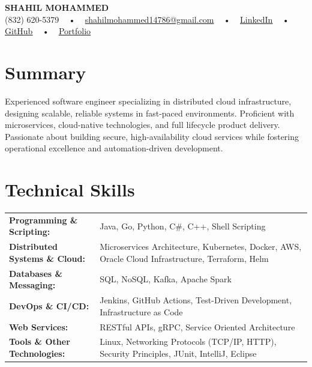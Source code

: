 \documentclass[letterpaper,11pt]{article}
\begin{document}
\begin{center}
    {\fontsize{14pt}{12pt}\selectfont \textbf{\MakeUppercase{Shahil Mohammed}}}\\ \vspace{2pt}
    \fontsize{10pt}{12pt}\selectfont (832) 620-5379 ~ • ~ \href{mailto:shahilmohammed14786@gmail.com}{shahilmohammed14786@gmail.com} ~ • ~  
    \href{https://www.linkedin.com/in/shahil-mohammed-9652931a1/}{\color{blue}\underline{LinkedIn}}  ~ • ~ 
    \href{https://github.com/freakbeast14}{\color{blue}\underline{GitHub}} ~ • ~ 
    \href{https://shahil-mohammed.netlify.app/}{\color{blue}\underline{Portfolio}}
    \vspace{-8pt}
\end{center}

\section{Summary}
\fontsize{9pt}{10pt}\selectfont
Experienced software engineer specializing in distributed cloud infrastructure, designing scalable, reliable systems in fast-paced environments. Proficient with microservices, cloud-native technologies, and full lifecycle product delivery. Passionate about building secure, high-availability cloud services while fostering operational excellence and automation-driven development.
 \vspace{-5pt}
 
\section{Technical Skills}
        \vspace{-14pt}
        \begin{table}[h]
            \fontsize{9pt}{10pt}\selectfont
            \begin{tabular}{p{0.3\linewidth} p{0.7\linewidth}}
                \textbf{Programming \& Scripting:} & Java, Go, Python, C\#, C++, Shell Scripting \\
                \textbf{Distributed Systems \& Cloud:} & Microservices Architecture, Kubernetes, Docker, AWS, Oracle Cloud Infrastructure, Terraform, Helm \\
                \textbf{Databases \& Messaging:} & SQL, NoSQL, Kafka, Apache Spark \\
                \textbf{DevOps \& CI/CD:} & Jenkins, GitHub Actions, Test-Driven Development, Infrastructure as Code \\
                \textbf{Web Services:} & RESTful APIs, gRPC, Service Oriented Architecture \\
                \textbf{Tools \& Other Technologies:} & Linux, Networking Protocols (TCP/IP, HTTP), Security Principles, JUnit, IntelliJ, Eclipse \\
            \end{tabular}
        \end{table}
 \vspace{-15pt}
 
\end{document}
